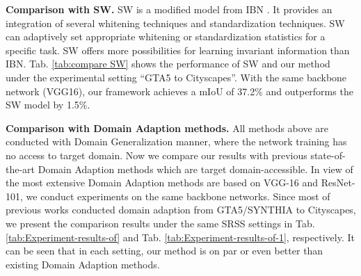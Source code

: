 \documentclass[twocolumn,journal,vlined,ruled,linesnumbered]{IEEEtran}
\begin{document}
\textbf{Comparison with SW.} SW \cite{pan2019switchable} is a modified model from IBN \cite{pan2018two}. It provides an integration of several whitening techniques and standardization techniques. SW can adaptively set appropriate whitening or standardization statistics for a specific task. SW offers more possibilities for learning invariant information than IBN. Tab. \ref{tab:compare SW} shows the performance of SW and our method under the experimental setting ``GTA5 to Cityscapes''. With the same backbone network (VGG16), our framework achieves a mIoU of 37.2\% and outperforms the SW model by 1.5\%.



\textbf{Comparison with Domain Adaption methods.} All methods above are conducted with Domain Generalization manner, where the network training has no access to target domain. Now we compare our results with previous state-of-the-art Domain Adaption methods which are target domain-accessible. In view of the most extensive Domain Adaption methods are based on VGG-16 and ResNet-101, we conduct experiments on the same backbone networks. Since most of previous works conducted domain adaption from GTA5/SYNTHIA to Cityscapes, we present the comparison results under the same SRSS settings in Tab. \ref{tab:Experiment-results-of} and Tab. \ref{tab:Experiment-results-of-1}, respectively. It can be seen that in each setting, our method is on par or even better than existing Domain Adaption methods.
\end{document}
